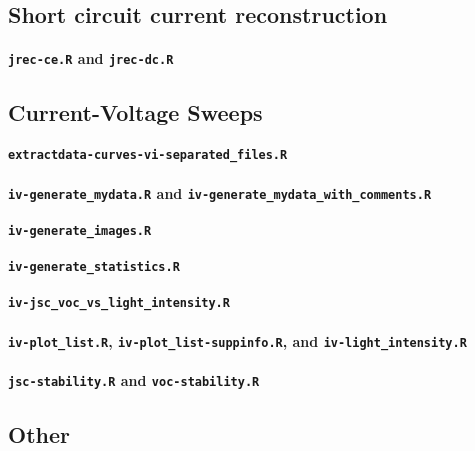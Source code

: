 \subsection{Short circuit current reconstruction}


\paragraph{\texttt{jrec-ce.R} and \texttt{jrec-dc.R}}

\subsection{Current-Voltage Sweeps}
\paragraph{\texttt{extractdata-curves-vi-separated_files.R}}
\paragraph{\texttt{iv-generate_mydata.R} and \texttt{iv-generate_mydata_with_comments.R}}
\paragraph{\texttt{iv-generate_images.R}}
\paragraph{\texttt{iv-generate_statistics.R}}
\paragraph{\texttt{iv-jsc_voc_vs_light_intensity.R}}
\paragraph{\texttt{iv-plot_list.R}, \texttt{iv-plot_list-suppinfo.R}, and \texttt{iv-light_intensity.R}}

\paragraph{\texttt{jsc-stability.R} and \texttt{voc-stability.R}}

\subsection{Other}
